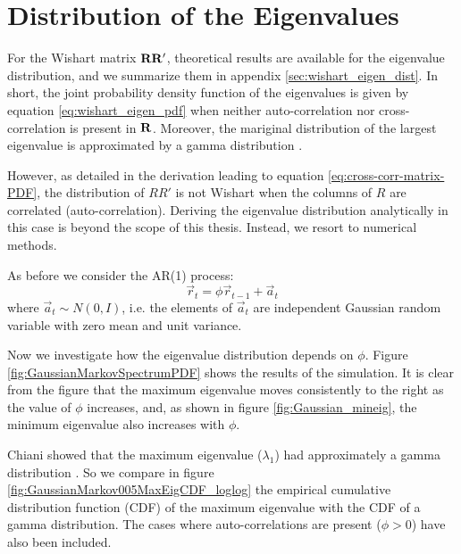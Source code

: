 \section{Distribution of the Eigenvalues}\label{sec:GCC-numerical}
For the Wishart matrix $\mathbf{RR'}$, theoretical results are available
for the eigenvalue distribution, and we summarize them in appendix
\ref{sec:wishart_eigen_dist}. In short, the joint probability density
function of the eigenvalues is given by equation
\ref{eq:wishart_eigen_pdf} when neither auto-correlation nor
cross-correlation is present in $\mathbf{R}$. Moreover, the mariginal
distribution of the largest eigenvalue is approximated by a gamma
distribution \cite{Chiani2012}.

However, as detailed in the derivation leading to equation
\ref{eq:cross-corr-matrix-PDF}, the distribution of $RR'$ is not
Wishart when the columns of $R$ are correlated
(auto-correlation). Deriving the eigenvalue distribution analytically
in this case is beyond the scope of this thesis. Instead, we resort to
numerical methods.

As before we consider the AR(1) process:
\begin{equation*}
  \vec{r}_t = \phi \vec{r}_{t-1} + \vec{a}_{t}
\end{equation*}
where $\vec{a}_t \sim N(0, I)$, i.e. the elements of $\vec{a}_t$ are
independent Gaussian random variable with zero mean and unit
variance.

Now we investigate how the eigenvalue distribution depends on
$\phi$. Figure \ref{fig:GaussianMarkovSpectrumPDF} shows the results
of the simulation. 
It is clear from the figure that the maximum eigenvalue moves
consistently to the right as the value of $\phi$ increases, and, as
shown in figure \ref{fig:Gaussian_mineig}, the minimum eigenvalue
also increases with $\phi$.

Chiani showed that the maximum eigenvalue ($\lambda_1$) had
approximately a gamma distribution \cite{Chiani2012}. So we compare in
figure \ref{fig:GaussianMarkov005MaxEigCDF_loglog} the empirical
cumulative distribution function (CDF) of the maximum eigenvalue 
with the CDF of a gamma distribution. The cases where
auto-correlations are present ($\phi > 0$) have also been included.

